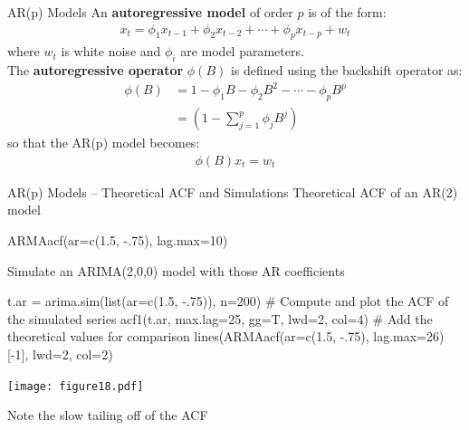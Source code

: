 \documentclass[ignorenonframetext,xcolor=x11names]{beamer}
\begin{document}
\begin{frame}{AR(p) Models}
An \textbf{autoregressive model} of order $p$ is of the form:
\begin{align*}
x_t = \phi_1 x_{t-1} + \phi_2 x_{t-2} + \cdots + \phi_p x_{t-p} + w_t
\end{align*}
where $w_t$ is white noise and $\phi_i$ are model parameters. \\



The \textbf{autoregressive operator} $\phi(B)$ is defined using the backshift operator as: 
\begin{align*}
\phi (B) &= 1 - \phi_1 B - \phi_2 B^2 - \cdots - \phi_p B^p \\
         &= \left(1 - \sum_{j=1}^p \phi_j B^j \right)
\end{align*}
so that the AR(p) model becomes:
\begin{align*}
\phi (B) x_t = w_t
\end{align*}
\end{frame}


\begin{frame}[fragile]{AR(p) Models -- Theoretical ACF and Simulations}
Theoretical ACF of an AR(2) model
\begin{Rcode}
ARMAacf(ar=c(1.5, -.75), lag.max=10)
\end{Rcode}
Simulate an ARIMA(2,0,0) model with those AR coefficients
\begin{Rcode}
t.ar = arima.sim(list(ar=c(1.5, -.75)), n=200)
# Compute and plot the ACF of the simulated series
acf1(t.ar, max.lag=25, gg=T, lwd=2, col=4)
# Add the theoretical values for comparison
lines(ARMAacf(ar=c(1.5, -.75), lag.max=26)[-1], lwd=2, col=2)
\end{Rcode}
\begin{center}
\texttt{[image: figure18.pdf]}

Note the slow tailing off of the ACF
\end{center}
\end{frame}
\end{document}
